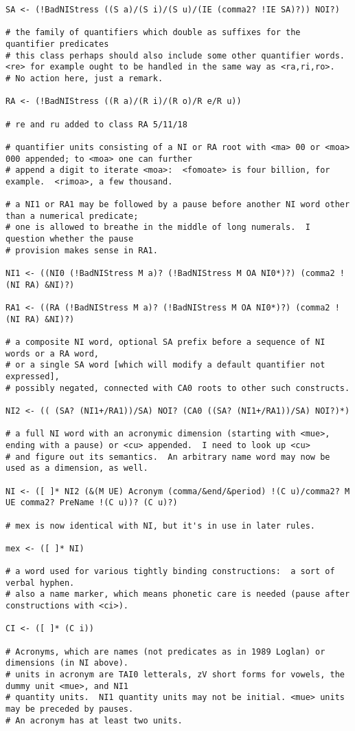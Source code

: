 \documentclass{article}
\begin{document}
\begin{verbatim}
SA <- (!BadNIStress ((S a)/(S i)/(S u)/(IE (comma2? !IE SA)?)) NOI?)

# the family of quantifiers which double as suffixes for the quantifier predicates
# this class perhaps should also include some other quantifier words. <re> for example ought to be handled in the same way as <ra,ri,ro>.
# No action here, just a remark.

RA <- (!BadNIStress ((R a)/(R i)/(R o)/R e/R u))

# re and ru added to class RA 5/11/18

# quantifier units consisting of a NI or RA root with <ma> 00 or <moa> 000 appended; to <moa> one can further
# append a digit to iterate <moa>:  <fomoate> is four billion, for example.  <rimoa>, a few thousand.

# a NI1 or RA1 may be followed by a pause before another NI word other than a numerical predicate;
# one is allowed to breathe in the middle of long numerals.  I question whether the pause
# provision makes sense in RA1.

NI1 <- ((NI0 (!BadNIStress M a)? (!BadNIStress M OA NI0*)?) (comma2 !(NI RA) &NI)?)

RA1 <- ((RA (!BadNIStress M a)? (!BadNIStress M OA NI0*)?) (comma2 !(NI RA) &NI)?)

# a composite NI word, optional SA prefix before a sequence of NI words or a RA word,
# or a single SA word [which will modify a default quantifier not expressed], 
# possibly negated, connected with CA0 roots to other such constructs.

NI2 <- (( (SA? (NI1+/RA1))/SA) NOI? (CA0 ((SA? (NI1+/RA1))/SA) NOI?)*)

# a full NI word with an acronymic dimension (starting with <mue>, ending with a pause) or <cu> appended.  I need to look up <cu>
# and figure out its semantics.  An arbitrary name word may now be used as a dimension, as well.

NI <- ([ ]* NI2 (&(M UE) Acronym (comma/&end/&period) !(C u)/comma2? M UE comma2? PreName !(C u))? (C u)?)

# mex is now identical with NI, but it's in use in later rules.

mex <- ([ ]* NI)

# a word used for various tightly binding constructions:  a sort of verbal hyphen.
# also a name marker, which means phonetic care is needed (pause after constructions with <ci>).

CI <- ([ ]* (C i))

# Acronyms, which are names (not predicates as in 1989 Loglan) or dimensions (in NI above).
# units in acronym are TAI0 letterals, zV short forms for vowels, the dummy unit <mue>, and NI1
# quantity units.  NI1 quantity units may not be initial. <mue> units may be preceded by pauses.
# An acronym has at least two units.


\end{verbatim}
\end{document}
